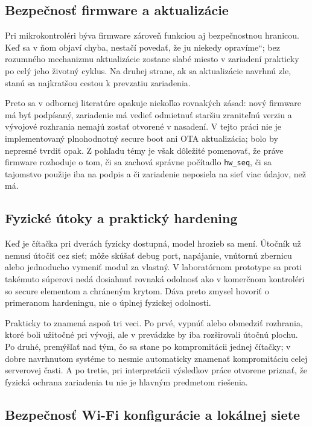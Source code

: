 \documentclass[journal,a4paper,onecolumn]{IEEEtran}
\newcommand{\uv}[1]{\quotedblbase#1\textquotedblleft}
\begin{document}
\subsection{Bezpečnosť firmware a aktualizácie}

Pri mikrokontroléri býva firmware zároveň funkciou aj bezpečnostnou hranicou. Keď sa v ňom objaví chyba, nestačí povedať, že ju \uv{niekedy opravíme}; bez rozumného mechanizmu aktualizácie zostane slabé miesto v zariadení prakticky po celý jeho životný cyklus. Na druhej strane, ak sa aktualizácie navrhnú zle, stanú sa najkratšou cestou k prevzatiu zariadenia.

Preto sa v odbornej literatúre opakuje niekoľko rovnakých zásad: nový firmware má byť podpísaný, zariadenie má vedieť odmietnuť staršiu zraniteľnú verziu a vývojové rozhrania nemajú zostať otvorené v nasadení. V tejto práci nie je implementovaný plnohodnotný secure boot ani OTA aktualizácia; bolo by nepresné tvrdiť opak. Z pohľadu témy je však dôležité pomenovať, že práve firmware rozhoduje o tom, či sa zachová správne počítadlo \texttt{hw\_seq}, či sa tajomstvo použije iba na podpis a či zariadenie neposiela na sieť viac údajov, než má.

\subsection{Fyzické útoky a praktický hardening}

Keď je čítačka pri dverách fyzicky dostupná, model hrozieb sa mení. Útočník už nemusí útočiť cez sieť; môže skúšať debug port, napájanie, vnútornú zbernicu alebo jednoducho vymeniť modul za vlastný. V laboratórnom prototype sa proti takémuto súperovi nedá dosiahnuť rovnaká odolnosť ako v komerčnom kontroléri so secure elementom a chráneným krytom. Dáva preto zmysel hovoriť o primeranom hardeningu, nie o úplnej fyzickej odolnosti.

Prakticky to znamená aspoň tri veci. Po prvé, vypnúť alebo obmedziť rozhrania, ktoré boli užitočné pri vývoji, ale v prevádzke by iba rozširovali útočnú plochu. Po druhé, premýšľať nad tým, čo sa stane po kompromitácii jednej čítačky; v dobre navrhnutom systéme to nesmie automaticky znamenať kompromitáciu celej serverovej časti. A po tretie, pri interpretácii výsledkov práce otvorene priznať, že fyzická ochrana zariadenia tu nie je hlavným predmetom riešenia.

\subsection{Bezpečnosť Wi-Fi konfigurácie a lokálnej siete}
\end{document}
